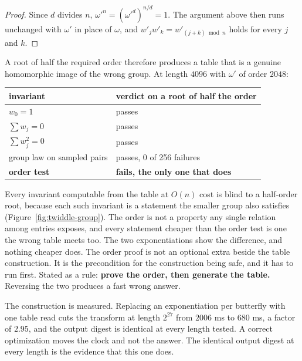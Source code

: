 \documentclass{article}
\begin{document}
\begin{proof}
Since \(d\) divides \(n\), \(\omega'^n = (\omega'^d)^{n/d} = 1\). The argument above then runs unchanged with \(\omega'\) in place of \(\omega\), and \(w'_j w'_k = w'_{(j+k) \bmod n}\) holds for every \(j\) and \(k\).
\end{proof}

A root of half the required order therefore produces a table that is a genuine homomorphic image of the wrong group. At length \(4096\) with \(\omega'\) of order \(2048\):

\begin{center}
\begin{tabular}{@{}ll@{}}
\toprule
invariant & verdict on a root of half the order \\
\midrule
\(w_0 = 1\) & passes \\
\(\sum w_j = 0\) & passes \\
\(\sum w_j^2 = 0\) & passes \\
group law on sampled pairs & passes, 0 of 256 failures \\
\textbf{order test} & \textbf{fails, the only one that does} \\
\bottomrule
\end{tabular}
\end{center}

Every invariant computable from the table at \(O(n)\) cost is blind to a half-order root, because each such invariant is a statement the smaller group also satisfies (Figure~\ref{fig:twiddle-group}). The order is not a property any single relation among entries exposes, and every statement cheaper than the order test is one the wrong table meets too. The two exponentiations show the difference, and nothing cheaper does. The order proof is not an optional extra beside the table construction. It is the precondition for the construction being safe, and it has to run first. Stated as a rule: \textbf{prove the order, then generate the table.} Reversing the two produces a fast wrong answer.

The construction is measured. Replacing an exponentiation per butterfly with one table read cuts the transform at length \(2^{27}\) from \(2006\) ms to \(680\) ms, a factor of \(2.95\), and the output digest is identical at every length tested. A correct optimization moves the clock and not the answer. The identical output digest at every length is the evidence that this one does.
\end{document}
